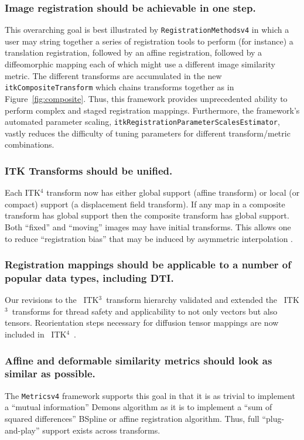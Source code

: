 \documentclass{frontiersSCNS}
\newcommand{\tk}{~ITK$^{\text{4}}$~}
\newcommand{\tkt}{~ITK$^{\text{3}}$~}
\begin{document}
\subsubsection{Image registration should be achievable in one step.}
This overarching goal is best illustrated by \texttt{RegistrationMethodsv4} in which a user may string
together a series of registration tools to perform (for instance) a
translation registration, followed by an affine registration, followed
by a diffeomorphic mapping each of which might use a different image
similarity metric.  The different transforms are accumulated in the
new \texttt{itkCompositeTransform} which chains transforms together as in Figure~\ref{fig:composite}.
Thus, this
framework provides unprecedented ability to perform complex and staged
registration mappings.  Furthermore, the framework’s automated
parameter scaling, \texttt{itkRegistrationParameterScalesEstimator}, 
vastly reduces the difficulty of tuning parameters for different
transform/metric combinations.  

\subsubsection{ITK Transforms should be unified.}
Each ITK$^4$ transform now has either global support (affine
  transform) or local (or compact) support (a displacement field transform).   If
  any map in a composite transform has global support then the
  composite transform has global support.  Both ``fixed'' and ``moving'' images may have initial
  transforms.  This allows one to reduce ``registration bias'' that
  may be induced by asymmetric interpolation \cite{Yushkevich2010a}. 

\subsubsection{Registration mappings should be applicable to a number of popular data
types, including DTI.}  Our revisions to the \tkt transform hierarchy
validated and extended the \tkt transforms for thread safety and
applicability to not only vectors but also tensors.  Reorientation
steps necessary for diffusion tensor mappings are now included in
\tk.  

\subsubsection{Affine and deformable similarity metrics should look as similar as possible.}
The \texttt{Metricsv4} framework supports this goal in that it is as trivial to
implement a “mutual information” Demons algorithm as it is to
implement a “sum of squared differences” BSpline or affine
registration algorithm.  Thus, full “plug-and-play” support exists
across transforms.   
\end{document}
